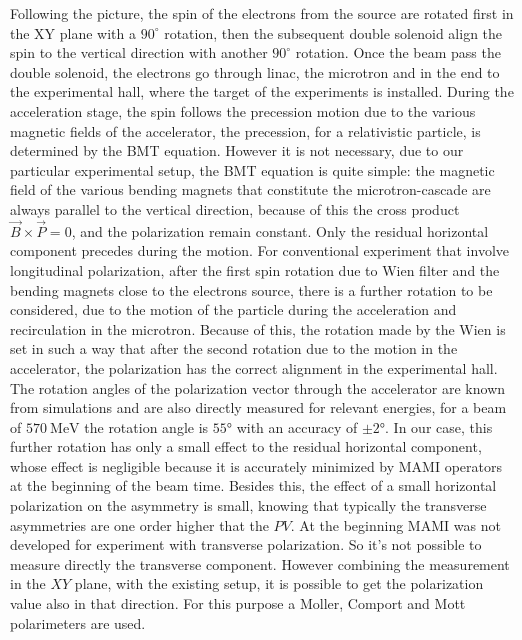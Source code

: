 Following the picture, the spin of the electrons from the source are rotated first in the XY plane with a $90^{\circ}$ rotation, then the subsequent double solenoid align the spin to the vertical direction with another $90^{\circ}$ rotation. 
Once the beam pass the double solenoid, the electrons go through linac, the microtron and in the end to the experimental hall, where the target of the experiments is installed. During the acceleration stage, the spin follows the precession motion due to the various magnetic fields of the accelerator, the precession, for a relativistic particle, is determined by the BMT equation.
However it is not necessary, due to our particular experimental setup, the BMT equation is quite simple: the magnetic field of the various bending magnets that constitute the microtron-cascade are always parallel to the vertical direction, because of this the cross product $\vec{B} \times \vec{P} = 0$, and the polarization remain constant. Only the residual horizontal component precedes during the motion. For conventional experiment that involve longitudinal polarization, after the first spin rotation due to Wien filter and the bending magnets close to the electrons source, there is a further rotation to be considered, due to the motion of the particle during the acceleration and recirculation in the microtron. Because of this, the rotation made by the Wien is set in such a way that after the second rotation due to the motion in the accelerator, the polarization has the correct alignment in the experimental hall. The rotation angles of the polarization vector through the accelerator are known from simulations and are also directly measured for relevant energies, for a beam of $\SI{570}{\mega \electronvolt}$ the rotation angle is $\ang{55}$ with an accuracy of $\pm \ang{2}$. In our case, this further rotation has only a small effect to the residual horizontal component, whose effect is negligible because it is accurately minimized by MAMI operators at the beginning of the beam time. Besides this, the effect of a small horizontal polarization on the asymmetry is small, knowing that typically the transverse asymmetries are one order higher that the $PV$.
At the beginning MAMI was not developed for experiment with transverse polarization. So it's not possible to measure directly the transverse component. However combining the measurement in the $XY$ plane, with the existing setup, it is possible to get the polarization value also in that direction. For this purpose a Moller, Comport and Mott polarimeters are used.


